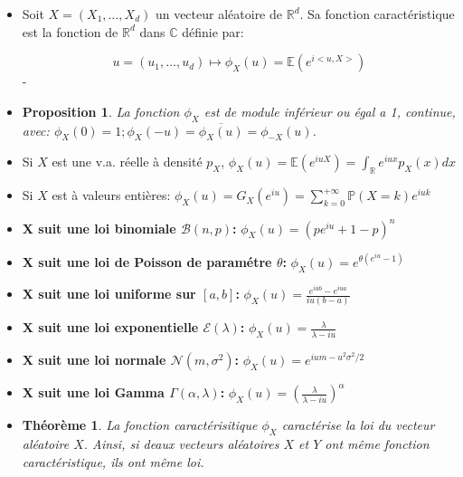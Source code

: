 \documentclass[10pt,a4paper,oneside]{article}
\newtheorem{theoreme}{Théorème}
\newtheorem{proposition}{Proposition}
\begin{document}
\begin{itemize}
\item
Soit $X = (X_1,\ldots,X_d)$ un vecteur aléatoire de $\mathbb{R}^d$. Sa fonction caractéristique est la fonction de $\mathbb{R}^d$ dans $\mathbb{C}$ définie par:

\[ u = (u_1,\ldots,u_d) \mapsto \phi_X(u) = \mathbb{E}(e^{i<u,X>}) \]
-%

\item
\begin{proposition}
La fonction $\phi_X$ est de module inférieur ou égal a 1, continue, avec: $\phi_X(0) = 1; \phi_X(-u) = \overline{\phi_X(u)} = \phi_{-X}(u)$.
\end{proposition}

\item
Si $X$ est une v.a. réelle à densité $p_X$, $\phi_X(u) = \mathbb{E}(e^{iuX}) = \int_{\mathbb{R}} e^{iux} p_X(x)dx$

\item
Si $X$ est à valeurs entières: $\phi_X(u) = G_X(e^{iu}) = \sum_{k = 0}^{+\infty} \mathbb{P}(X = k) e^{iuk}$

\item
\textbf{X suit une loi binomiale $\mathcal{B}(n,p)$:} $\phi_X(u) = (pe^{iu} + 1 - p)^n$

\item
\textbf{X suit une loi de Poisson de param\'etre $\theta$:} $\phi_X(u) = e^{\theta(e^{iu} - 1)}$

\item
\textbf{X suit une loi uniforme sur $[a,b]$:} $\phi_X(u) = \frac{e^{iub} - e^{iua}}{iu(b - a)}$

\item
\textbf{X suit une loi exponentielle $\mathcal{E}(\lambda)$:} $\phi_X(u) = \frac{\lambda}{\lambda - iu}$

\item
\textbf{X suit une loi normale $\mathcal{N}(m,\sigma^2)$:} $\phi_X(u) = e^{ium-u^2\sigma^2/2}$

\item
\textbf{X suit une loi Gamma $\Gamma(\alpha,\lambda)$:} $\phi_X(u) = (\frac{\lambda}{\lambda - iu})^\alpha$

\item
\begin{theoreme}
La fonction caract\'erisitique $\phi_X$ caract\'erise la loi du vecteur al\'eatoire $X$. Ainsi, si deaux vecteurs al\'eatoires $X$ et $Y$ ont même fonction caract\'eristique, ils ont même loi.
\end{theoreme}


\end{itemize}
\end{document}
